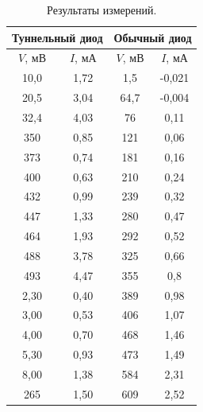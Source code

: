 \documentclass[a4paper,12pt]{article} %
\begin{document}
	\begin{table}[H]
		\caption{Результаты измерений.}
		\label{table:exp1}
		\begin{tabular}{|c|c|c|c|}
			\hline
			\multicolumn{2}{|c|}{Туннельный диод} & \multicolumn{2}{c|}{Обычный диод} \\ \hline
			$V$, мВ           & $I$, мА           & $V$, мВ         & $I$, мА         \\ \hline
			10,0              & 1,72              & 1,5             & -0,021          \\ \hline
			20,5              & 3,04              & 64,7            & -0,004          \\ \hline
			32,4              & 4,03              & 76              & 0,11            \\ \hline
			350               & 0,85              & 121             & 0,06            \\ \hline
			373               & 0,74              & 181             & 0,16            \\ \hline
			400               & 0,63              & 210             & 0,24            \\ \hline
			432               & 0,99              & 239             & 0,32            \\ \hline
			447               & 1,33              & 280             & 0,47            \\ \hline
			464               & 1,93              & 292             & 0,52            \\ \hline
			488               & 3,78              & 325             & 0,66            \\ \hline
			493               & 4,47              & 355             & 0,8             \\ \hline
			2,30              & 0,40              & 389             & 0,98            \\ \hline
			3,00              & 0,53              & 406             & 1,07            \\ \hline
			4,00              & 0,70              & 468             & 1,46            \\ \hline
			5,30              & 0,93              & 473             & 1,49            \\ \hline
			8,00              & 1,38              & 584             & 2,31            \\ \hline
			265               & 1,50              & 609             & 2,52            \\ \hline

\end{tabular}
\end{table}
\end{document}
